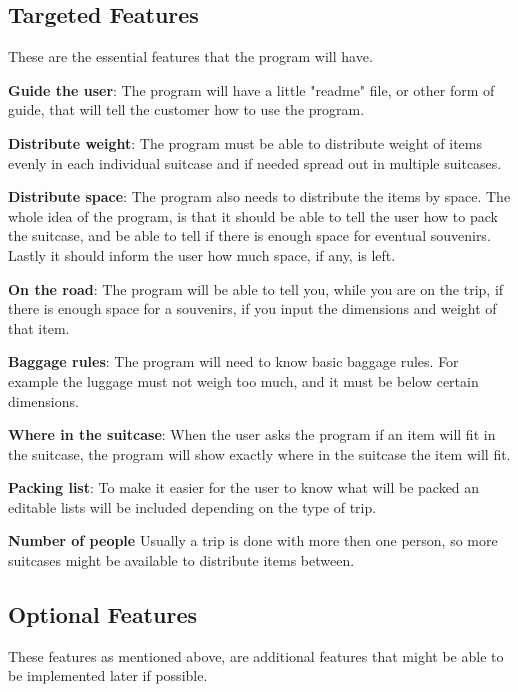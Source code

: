 \subsection{Targeted Features}
These are the essential features that the program will have.\newline

\textbf{Guide the user}:
The program will have a little "readme" file, or other form of guide, that will tell the customer how to use the program.
\newline

\textbf{Distribute weight}:
The program must be able to distribute weight of items evenly in each individual suitcase and if needed spread out in multiple suitcases.
\newline

\textbf{Distribute space}:
The program also needs to distribute the items by space. The whole idea of the program, is that it should be able to tell the user how to pack the suitcase, and be able to tell if there is enough space for eventual souvenirs. Lastly it should inform the user how much space, if any, is left.
\newline

\textbf{On the road}:
The program will be able to tell you, while you are on the trip, if there is enough space for a souvenirs, if you input the dimensions and weight of that item.
\newline

\textbf{Baggage rules}:
The program will need to know basic baggage rules. For example the luggage must not weigh too much, and it must be below certain dimensions.
\newline

\textbf{Where in the suitcase}:
When the user asks the program if an item will fit in the suitcase, the program will show exactly where in the suitcase the item will fit.
\newline

\textbf{Packing list}:
To make it easier for the user to know what will be packed an editable lists will be included depending on the type of trip.
\newline

\textbf{Number of people}
Usually a trip is done with more then one person, so more suitcases might be available to distribute items between.
\newline

\subsection{Optional Features}
These features as mentioned above, are additional features that might be able to be implemented later if possible.\newline

